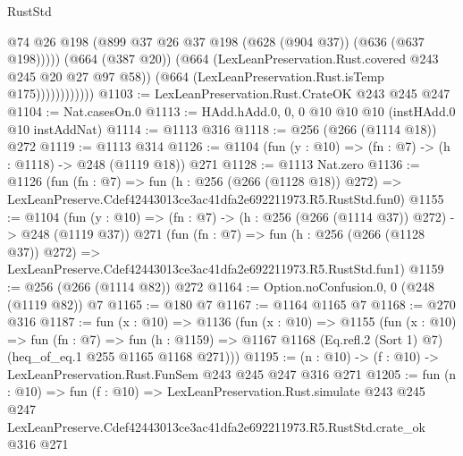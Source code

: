 \begin{lexlean}{RustStd}
\begin{coremodule}
                            @74
                            @26
                            @198
                            (@899 @37 @26 @37 @198 (@628 (@904 @37)) (@636 (@637 @198)))))
                        (@664 (@387 @20))
                        (@664 (LexLeanPreservation.Rust.covered @243 @245 @20 @27 @97 @58))
                        (@664 (LexLeanPreservation.Rust.isTemp @175))))))))))))
@1103 := LexLeanPreservation.Rust.CrateOK @243 @245 @247
@1104 := Nat.casesOn.{0}
@1113 := HAdd.hAdd.{0, 0, 0} @10 @10 @10 (instHAdd.{0} @10 instAddNat)
@1114 := @1113 @316
@1118 := @256 (@266 (@1114 @18)) @272
@1119 := @1113 @314
@1126 := @1104 (fun (y : @10) => (fn : @7) -> (h : @1118) -> @248 (@1119 @18)) @271
@1128 := @1113 Nat.zero
@1136 := @1126
    (fun (fn : @7) =>
    fun (h : @256 (@266 (@1128 @18)) @272) =>
    LexLeanPreserve.Cdef42443013ce3ac41dfa2e692211973.R5.RustStd.fun0)
@1155 := @1104
    (fun (y : @10) => (fn : @7) -> (h : @256 (@266 (@1114 @37)) @272) -> @248 (@1119 @37))
    @271
    (fun (fn : @7) =>
    fun (h : @256 (@266 (@1128 @37)) @272) =>
    LexLeanPreserve.Cdef42443013ce3ac41dfa2e692211973.R5.RustStd.fun1)
@1159 := @256 (@266 (@1114 @82)) @272
@1164 := Option.noConfusion.{0, 0} (@248 (@1119 @82)) @7
@1165 := @180 @7
@1167 := @1164 @1165 @7
@1168 := @270 @316
@1187 := fun (x : @10) =>
  @1136
    (fun (x : @10) =>
    @1155
      (fun (x : @10) =>
      fun (fn : @7) =>
      fun (h : @1159) =>
      @1167 @1168 (Eq.refl.{2} (Sort 1) @7) (heq_of_eq.{1} @255 @1165 @1168 @271)))
@1195 := (n : @10) -> (f : @10) -> LexLeanPreservation.Rust.FunSem @243 @245 @247 @316 @271
@1205 := fun (n : @10) =>
  fun (f : @10) =>
  LexLeanPreservation.Rust.simulate
    @243
    @245
    @247
    LexLeanPreserve.Cdef42443013ce3ac41dfa2e692211973.R5.RustStd.crate_ok
    @316
    @271
\end{coremodule}
\end{lexlean}
